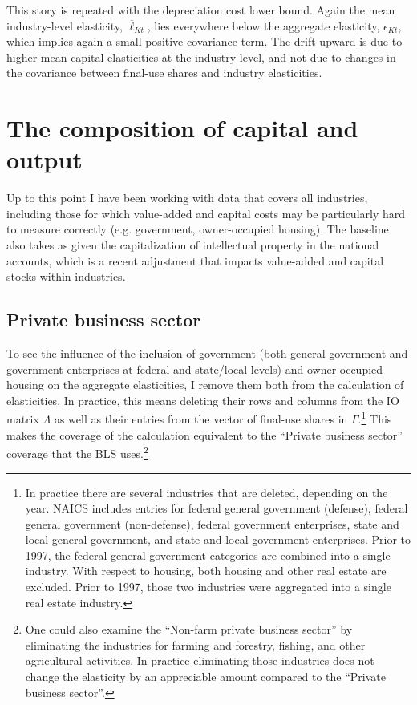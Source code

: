 \documentclass[11pt]{article}
\begin{document}
This story is repeated with the depreciation cost lower bound. Again the mean industry-level elasticity, $\overline{\ell}_{Kt}$, lies everywhere below the aggregate elasticity, $\epsilon_{Kt}$, which implies again a small positive covariance term. The drift upward is due to higher mean capital elasticities at the industry level, and not due to changes in the covariance between final-use shares and industry elasticities. 

\section{The composition of capital and output}
Up to this point I have been working with data that covers all industries, including those for which value-added and capital costs may be particularly hard to measure correctly (e.g. government, owner-occupied housing). The baseline also takes as given the capitalization of intellectual property in the national accounts, which is a recent adjustment that impacts value-added and capital stocks within industries.

\subsection{Private business sector}
To see the influence of the inclusion of government (both general government and government enterprises at federal and state/local levels) and owner-occupied housing on the aggregate elasticities, I remove them both from the calculation of elasticities. In practice, this means deleting their rows and columns from the IO matrix $\Lambda$ as well as their entries from the vector of final-use shares in $\Gamma$.\footnote{In practice there are several industries that are deleted, depending on the year. NAICS includes entries for federal general government (defense), federal general government (non-defense), federal government enterprises, state and local general government, and state and local government enterprises. Prior to 1997, the federal general government categories are combined into a single industry. With respect to housing, both housing and other real estate are excluded. Prior to 1997, those two industries were aggregated into a single real estate industry.} This makes the coverage of the calculation equivalent to the ``Private business sector'' coverage that the BLS uses.\footnote{One could also examine the ``Non-farm private business sector'' by eliminating the industries for farming and forestry, fishing, and other agricultural activities. In practice eliminating those industries does not change the elasticity by an appreciable amount compared to the ``Private business sector''.} 
\end{document}
